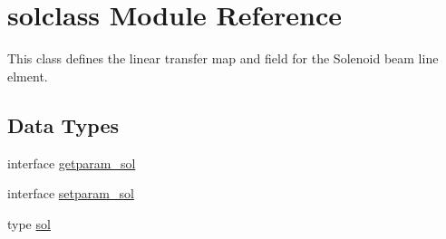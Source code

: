 \hypertarget{namespacesolclass}{}\section{solclass Module Reference}
\label{namespacesolclass}


This class defines the linear transfer map and field for the Solenoid beam line elment.  


\subsection*{Data Types}
\begin{DoxyCompactItemize}
\item 
interface \mbox{\hyperlink{interfacesolclass_1_1getparam__sol}{getparam\+\_\+sol}}
\item 
interface \mbox{\hyperlink{interfacesolclass_1_1setparam__sol}{setparam\+\_\+sol}}
\item 
type \mbox{\hyperlink{namespacesolclass_structsolclass_1_1sol}{sol}}
\end{DoxyCompactItemize}
